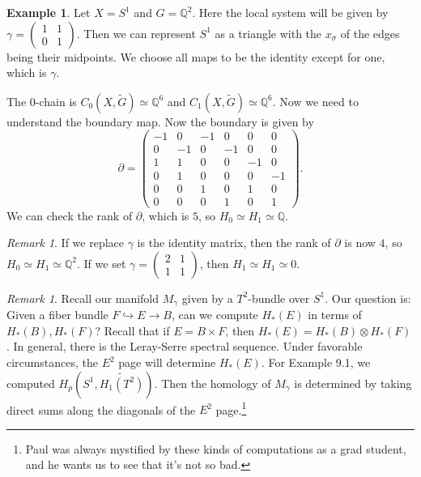 \documentclass[leqno, openany]{memoir}
\theoremstyle{definition}
\newtheorem{exm}[thm]{Example}
\theoremstyle{remark}
\newtheorem{rmk}[thm]{Remark}
\theoremstyle{plain}
\theoremstyle{definition}
\theoremstyle{remark}
\newcommand{\Q}{\mathbb{Q}}
\begin{document}
\begin{exm}
    Let $X = S^1$ and $G = \Q^2$. Here the local system will be given by $ \gamma =  \begin{pmatrix}
        1 & 1 \\0 & 1
    \end{pmatrix} $. Then we can represent $S^1$ as a triangle with the $x_{\sigma}$ of the edges being their midpoints. We choose all maps to be the identity except for one, which is $\gamma$.

    The $0$-chain is $C_0(X, \widetilde{G}) \simeq \Q^6$ and $C_1(X, \widetilde{G}) \simeq \Q^6$. Now we need to understand the boundary map. Now the boundary is given by
    \[ \partial = \begin{pmatrix}
        -1 & 0  & -1 & 0  & 0  & 0  \\
         0 & -1 & 0  & -1 & 0  & 0  \\
        1  & 1  & 0  & 0  & -1 & 0  \\
        0  & 1  & 0  & 0  & 0  & -1 \\
        0  & 0  & 1  & 0  & 1  & 0  \\
        0  & 0  & 0  & 1  & 0  & 1
    \end{pmatrix}. \]
    We can check the rank of $\partial$, which is $5$, so $H_0 \simeq H_1 \simeq \Q$.
\end{exm}

\begin{rmk}
    If we replace $\gamma$ is the identity matrix, then the rank of $\partial$ is now $4$, so $H_0 \simeq H_1 \simeq \Q^2$. If we set $\gamma = \begin{pmatrix}
        2 & 1 \\1 & 1
    \end{pmatrix}$, then $H_1 \simeq H_1 \simeq 0$.
\end{rmk}

\begin{rmk}
    Recall our manifold $M_{\gamma}$ given by a $T^2$-bundle over $S^1$. Our question is: Given a fiber bundle $F \hookrightarrow E \to B$, can we compute $H_*(E)$ in terms of $H_*(B), H_*(F)$? Recall that if $E = B \times F$, then $H_*(E) = H_*(B) \otimes H_*(F)$. In general, there is the Leray-Serre spectral sequence. Under favorable circumstances, the $E^2$ page will determine $H_*(E)$. For Example 9.1, we computed $H_p(S^1, \widetilde{H_1(T^2)})$. Then the homology of $M_{\gamma}$ is determined by taking direct sums along the diagonals of the $E^2$ page.\footnote{Paul was always mystified by these kinds of computations as a grad student, and he wants us to see that it's not so bad.}
\end{rmk}
\end{document}
